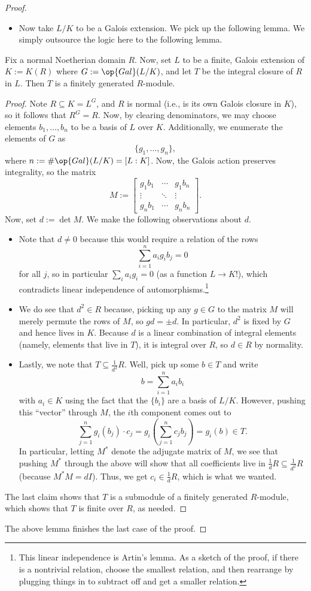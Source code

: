 \begin{proof}
\begin{itemize}
		\item Now take $L/K$ to be a Galois extension. We pick up the following lemma. We simply outsource the logic here to the following lemma.
	\end{itemize}
	\begin{lemma}
		Fix a normal Noetherian domain $R$. Now, set $L$ to be a finite, Galois extension of $K:=K(R)$ where $G:=\op{Gal}(L/K)$, and let $T$ be the integral closure of $R$ in $L$. Then $T$ is a finitely generated $R$-module.
	\end{lemma}
	\begin{proof}
		Note $R\subseteq K=L^G$, and $R$ is normal (i.e., is its own Galois closure in $K$), so it follows that $R^G=R$. Now, by clearing denominators, we may choose elements $b_1,\ldots,b_n$ to be a basis of $L$ over $K$. Additionally, we enumerate the elements of $G$ as
		\[\{g_1,\ldots,g_n\},\]
		where $n:=\#\op{Gal}(L/K)=[L:K]$. Now, the Galois action preserves integrality, so the matrix
		\[M:=\begin{bmatrix}
			g_1b_1 & \cdots & g_1b_n \\
			\vdots & \ddots & \vdots \\
			g_nb_1 & \cdots & g_nb_n
		\end{bmatrix}.\]
		Now, set $d:=\det M$. We make the following observations about $d$.
		\begin{itemize}
			\item Note that $d\ne0$ because this would require a relation of the rows
			\[\sum_{i=1}^na_ig_ib_j=0\]
			for all $j$, so in particular $\sum_ia_ig_i=0$ (as a function $L\to K$!), which contradicts linear independence of automorphisms.\footnote{This linear independence is Artin's lemma. As a sketch of the proof, if there is a nontrivial relation, choose the smallest relation, and then rearrange by plugging things in to subtract off and get a smaller relation.}
			\item We do see that $d^2\in R$ because, picking up any $g\in G$ to the matrix $M$ will merely permute the rows of $M$, so $gd=\pm d$. In particular, $d^2$ is fixed by $G$ and hence lives in $K$. Because $d$ is a linear combination of integral elements (namely, elements that live in $T$), it is integral over $R$, so $d\in R$ by normality.
			\item Lastly, we note that $T\subseteq\frac1{d^2}R$. Well, pick up some $b\in T$ and write
			\[b=\sum_{i=1}^na_ib_i\]
			with $a_i\in K$ using the fact that the $\{b_i\}$ are a basis of $L/K$. However, pushing this ``vector'' through $M$, the $i$th component comes out to
			\[\sum_{j=1}^ng_i(b_j)\cdot c_j=g_i\left(\sum_{j=1}^nc_jb_j\right)=g_i(b)\in T.\]
			In particular, letting $M^*$ denote the adjugate matrix of $M$, we see that pushing $M^*$ through the above will show that all coefficients live in $\frac 1dR\subseteq\frac1{d^2}R$ (because $M^*M=dI$). Thus, we get $c_i\in\frac1dR$, which is what we wanted.
		\end{itemize}
		The last claim shows that $T$ is a submodule of a finitely generated $R$-module, which shows that $T$ is finite over $R$, as needed.
	\end{proof}
	The above lemma finishes the last case of the proof.
\end{proof}
